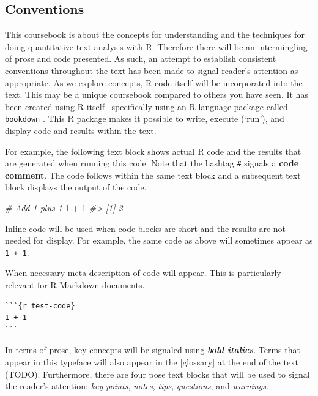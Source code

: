 \documentclass[
]{article}
\newenvironment{Shaded}{\begin{snugshade}}{\end{snugshade}}
\newcommand{\CommentTok}[1]{\textcolor[rgb]{0.56,0.35,0.01}{\textit{#1}}}
\newcommand{\DecValTok}[1]{\textcolor[rgb]{0.00,0.00,0.81}{#1}}
\newcommand{\SpecialCharTok}[1]{\textcolor[rgb]{0.00,0.00,0.00}{#1}}
\begin{document}
\hypertarget{conventions}{%
\subsection*{Conventions}\label{conventions}}

This coursebook is about the concepts for understanding and the techniques for doing quantitative text analysis with R. Therefore there will be an intermingling of prose and code presented. As such, an attempt to establish consistent conventions throughout the text has been made to signal reader's attention as appropriate. As we explore concepts, R code itself will be incorporated into the text. This may be a unique coursebook compared to others you have seen. It has been created using R itself --specifically using an R language package called \texttt{bookdown} \citep{R-bookdown}. This R package makes it possible to write, execute (`run'), and display code and results within the text.

For example, the following text block shows actual R code and the results that are generated when running this code. Note that the hashtag \texttt{\#} signals a \textbf{code comment}. The code follows within the same text block and a subsequent text block displays the output of the code.

\begin{Shaded}
\begin{Highlighting}[]
\CommentTok{\# Add 1 plus 1}
\DecValTok{1} \SpecialCharTok{+} \DecValTok{1}
\CommentTok{\#\textgreater{} [1] 2}
\end{Highlighting}
\end{Shaded}

Inline code will be used when code blocks are short and the results are not needed for display. For example, the same code as above will sometimes appear as \texttt{1\ +\ 1}.

When necessary meta-description of code will appear. This is particularly relevant for R Markdown documents.

\begin{verbatim}
```{r test-code}
1 + 1
```
\end{verbatim}

In terms of prose, key concepts will be signaled using \textbf{\emph{bold italics}}. Terms that appear in this typeface will also appear in the {[}glossary{]} at the end of the text (TODO). Furthermore, there are four pose text blocks that will be used to signal the reader's attention: \emph{key points}, \emph{notes}, \emph{tips}, \emph{questions}, and \emph{warnings}.
\end{document}
